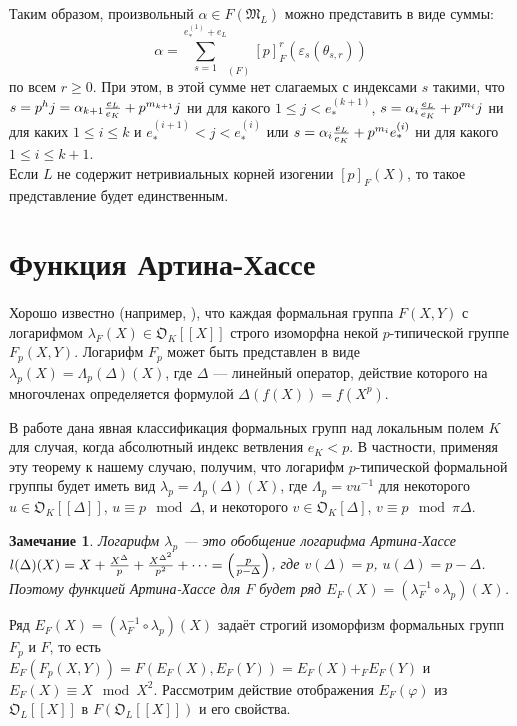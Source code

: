 \documentclass[a4paper]{article}
\newcommand{\ML}{\mathfrak{M}_L}
\newcommand{\OK}{\mathfrak{O}_K}
\newcommand{\OL}{\mathfrak{O}_L}
\newcommand{\Leq}{\leqslant}
\newcommand{\Geq}{\geqslant}
\newtheorem{note}{Замечание}
\begin{document}
Таким образом, произвольный $\alpha \in F(\ML)$ можно представить в виде суммы: 
$$\alpha = {\sum\limits_{s=1}^{e_*^{(1)} + e_L}}_{(F)}[p]_F^r(\varepsilon_s(\theta_{s,r}))$$
по всем $r \Geq 0$. При этом, в этой сумме нет слагаемых с индексами $s$ такими, что $s = p^hj=\alpha_{k+1}{e_L \over e_K} + p^{m_{k+1}}j$ ни для какого $1 \Leq j < e_*^{(k+1)}$, $s = \alpha_i{e_L \over e_K}+p^{m_i}j$ ни для каких $1\Leq i\Leq k$ и $e_*^{(i+1)} < j < e_*^{(i)}$ или $s = \alpha_i{e_L \over e_K} + p^{m_i}e_*^{(i)}$ ни для какого $1\Leq i\Leq k+1$.\\
Если $L$ не содержит нетривиальных корней изогении $[p]_F(X)$, то такое представление будет единственным.


\section{Функция Артина-Хассе}
\paragraph{}

Хорошо известно (например, \cite[\S 1.1]{book3}), что каждая формальная группа $F(X,Y)$ с логарифмом $\lambda_F(X) \in \OK[[X]]$ строго изоморфна некой $p$-типической группе $F_p(X,Y)$. Логарифм $F_p$ может быть представлен в виде $\lambda_p(X)=\Lambda_p(\Delta)(X)$, где $\Delta$ --- линейный оператор, действие которого на многочленах определяется формулой $\Delta(f(X)) = f(X^p)$.

В работе \cite[Теорема 6.3.1]{book3} дана явная классификация формальных групп над локальным полем $K$ для случая, когда абсолютный индекс ветвления $e_K < p$. В частности, применяя эту теорему к нашему случаю, получим, что логарифм $p$-типической формальной группы будет иметь вид $\lambda_p=\Lambda_p(\Delta)(X)$, где $\Lambda_p = vu^{-1}$ для некоторого $u\in \OK[[\Delta]]$, $u \equiv p \mod \Delta$, и некоторого $v \in \OK[\Delta]$, $v \equiv p \mod \pi\Delta$.\\

\begin{note}
	Логарифм $\lambda_p$ --- это обобщение логарифма Артина-Хассе $l(\Delta)(X)=X+{X^\Delta\over p}+{X^{\Delta^2}\over p^2}+\dots = \left(p \over {p-\Delta}\right)$, где $v(\Delta) = p$, $u(\Delta) = p-\Delta$. Поэтому функцией Артина-Хассе для $F$ будет ряд $E_F(X) = (\lambda_F^{-1}\circ\lambda_p)(X)$.
\end{note}

Ряд $E_F(X)=(\lambda_F^{-1}\circ\lambda_{p})(X)$ задаёт строгий изоморфизм формальных групп $F_p$ и $F$, то есть $E_F(F_{p}(X,Y)) = F(E_F(X),E_F(Y)) = E_F(X) +_F E_F(Y)$ и $E_F(X) \equiv X \mod X^2$.
Рассмотрим действие отображения $E_F(\varphi)$ из $\OL[[X]]$ в $F(\OL[[X]])$ и его свойства.
\end{document}
